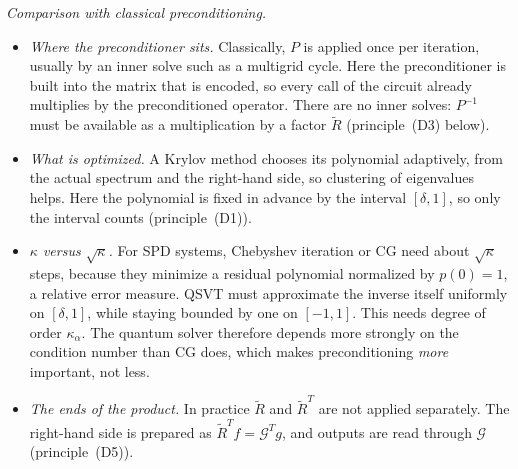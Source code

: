 \documentclass[11pt,a4paper]{article}
\newcommand{\G}{\mathcal{G}}
\newcommand{\Rt}{\widetilde R}
\theoremstyle{remark}
\begin{document}
\emph{Comparison with classical preconditioning.}
\begin{itemize}
\item \emph{Where the preconditioner sits.} Classically, $P$ is applied once per
  iteration, usually by an inner solve such as a multigrid cycle. Here the
  preconditioner is built into the matrix that is encoded, so every call of
  the circuit already multiplies by the preconditioned operator. There are
  no inner solves: $P^{-1}$ must be available as a multiplication by a factor
  $\Rt$ (principle~(D3) below).
\item \emph{What is optimized.} A Krylov method chooses its polynomial
  adaptively, from the actual spectrum and the right-hand side, so
  clustering of eigenvalues helps. Here the polynomial is fixed in advance
  by the interval $[\delta,1]$, so only the interval counts (principle~(D1)).
\item \emph{$\kappa$ versus $\sqrt\kappa$.} For SPD systems, Chebyshev iteration or CG
  need about $\sqrt\kappa$ steps, because they minimize a residual polynomial
  normalized by $p(0)=1$, a relative error measure. QSVT must approximate
  the inverse itself uniformly on $[\delta,1]$, while staying bounded by one on
  $[-1,1]$. This needs degree of order $\kappa_\alpha$. The quantum solver therefore
  depends more strongly on the condition number than CG does, which makes
  preconditioning \emph{more} important, not less.
\item \emph{The ends of the product.} In practice $\Rt$ and $\Rt^T$ are not
  applied separately. The right-hand side is prepared as $\Rt^Tf=\G^Tg$, and
  outputs are read through $\G$ (principle~(D5)).
\end{itemize}
\end{document}
